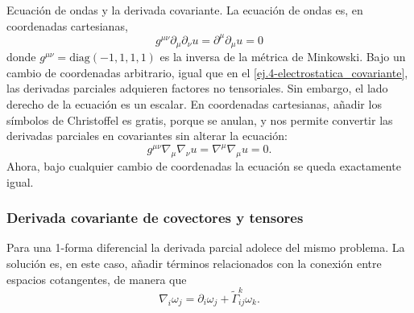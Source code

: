 \begin{example}
    {Ecuación de ondas y la derivada covariante.
    \label{ej.4-ondas_covariante}}
    La ecuación de ondas es, en coordenadas cartesianas,
    \begin{equation*}
        g^{\mu\nu}\partial_\mu\partial_\nu u = \partial^\mu \partial_\mu u = 0
    \end{equation*}
    donde \(g^{\mu\nu} = \text{diag}(-1, 1, 1, 1)\) es la inversa de la métrica de Minkowski. Bajo un cambio de coordenadas arbitrario, igual que en el \cref{ej.4-electrostatica_covariante}, las derivadas parciales adquieren factores no tensoriales. Sin embargo, el lado derecho de la ecuación es un escalar. En coordenadas cartesianas, añadir los símbolos de Christoffel es gratis, porque se anulan, y nos permite convertir las derivadas parciales en covariantes sin alterar la ecuación:
    \begin{equation*}
        g^{\mu\nu}\nabla_\mu\nabla_\nu u = \nabla^\mu \nabla_\mu u = 0.
    \end{equation*}
    Ahora, bajo cualquier cambio de coordenadas la ecuación se queda exactamente igual.
\end{example}

\subsubsection{Derivada covariante de covectores y tensores}
\label{subsubsec.4derivadacovariante_tensores}

Para una 1-forma diferencial la derivada parcial adolece del mismo problema. La solución es, en este caso, añadir términos relacionados con la conexión entre espacios cotangentes, de manera que
\begin{equation}
    \nabla_i \omega_j = \partial_i\omega_j + \tilde{\Gamma}^k_{ij} \omega_k.
\end{equation}


